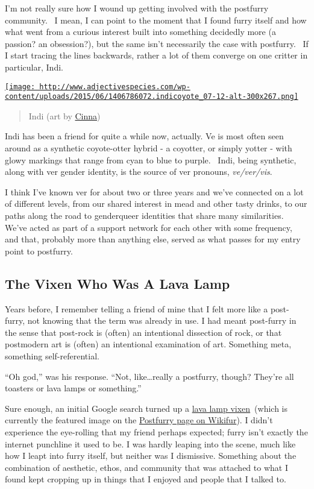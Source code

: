 I'm not really sure how I wound up getting involved with the postfurry
community.~ I mean, I can point to the moment that I found furry itself
and how what went from a curious interest built into something decidedly
more (a passion? an obsession?), but the same isn't necessarily the case
with postfurry.~ If I start tracing the lines backwards, rather a lot of
them converge on one critter in particular, Indi.

\href{http://indi.latrani.net/}{\texttt{[image: http://www.adjectivespecies.com/wp-content/uploads/2015/06/1406786072.indicoyote\_07-12-alt-300x267.png]}}

\begin{quote}
Indi (art by \href{http://www.furaffinity.net/user/nowandlater/}{Cinna})
\end{quote}

Indi has been a friend for quite a while now, actually. Ve is most often
seen around as a synthetic coyote-otter hybrid - a coyotter, or simply
yotter - with glowy markings that range from cyan to blue to purple.
~Indi, being synthetic, along with ver gender identity, is the source of
ver pronouns, \emph{ve/ver/vis}.

I think I've known ver for about two or three years and we've connected
on a lot of different levels, from our shared interest in mead and other
tasty drinks, to our paths along the road to genderqueer identities that
share many similarities.~ We've acted as part of a support network for
each other with some frequency, and that, probably more than anything
else, served as what passes for my entry point to postfurry.

\subsection{The Vixen Who Was A Lava
Lamp}\label{the-vixen-who-was-a-lava-lamp}

Years before, I remember telling a friend of mine that I felt more like
a post-furry, not knowing that the term was already in use. I had meant
post-furry in the sense that post-rock is (often) an intentional
dissection of rock, or that postmodern art is (often) an intentional
examination of art. Something meta, something self-referential.

``Oh god,'' was his response. ``Not, like\ldots{}really a postfurry,
though? They're all toasters or lava lamps or something.''

Sure enough, an initial Google search turned up a
\href{http://www.furaffinity.net/view/517420/}{lava lamp vixen}~(which
is currently the featured image on the
\href{http://en.wikifur.com/wiki/Postfurry}{Postfurry page on Wikifur}).
I didn't experience the eye-rolling that my friend perhaps expected;
furry isn't exactly the internet punchline it used to be. I was hardly
leaping into the scene, much like how I leapt into furry itself, but
neither was I dismissive. Something about the combination of aesthetic,
ethos, and community that was attached to what I found kept cropping up
in things that I enjoyed and people that I talked to.

